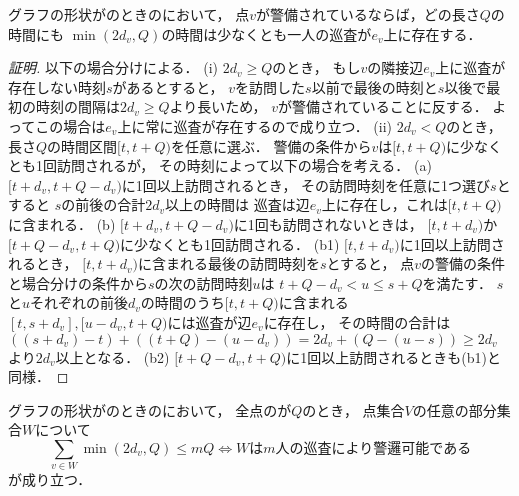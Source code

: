 \begin{lemm}
\label{lemm:star_cost_of_vertex}
グラフの形状が{\graphStar}のときの{\patProb}において，
点$v$が警備されているならば，どの長さ$Q$の時間にも
$\min(2d_v, Q)$の時間は少なくとも一人の巡査が$e_v$上に存在する．
\end{lemm}
\begin{proof}[証明]
以下の場合分けによる．
(i) $2d_v \geq Q$のとき，
もし$v$の隣接辺$e_v$上に巡査が存在しない時刻$s$があるとすると，
$v$を訪問した$s$以前で最後の時刻と$s$以後で最初の時刻の間隔は$2d_v \geq Q$より長いため，
$v$が警備されていることに反する．
よってこの場合は$e_v$上に常に巡査が存在するので成り立つ．
%
(ii) $2d_v < Q$のとき，
長さ$Q$の時間区間$[t, t + Q)$を任意に選ぶ．
警備の条件から$v$は$[t, t + Q)$に少なくとも1回訪問されるが，
その時刻によって以下の場合を考える．
%
(a) $[t + d_v, t + Q - d_v)$に1回以上訪問されるとき，
その訪問時刻を任意に1つ選び$s$とすると
$s$の前後の合計$2d_v$以上の時間は
巡査は辺$e_v$上に存在し，これは$[t, t + Q)$に含まれる．
%
(b) $[t + d_v, t + Q - d_v)$に1回も訪問されないときは，
$[t, t + d_v)$か$[t + Q - d_v, t + Q)$に少なくとも1回訪問される．
(b1) $[t, t + d_v)$に1回以上訪問されるとき，
$[t, t + d_v)$に含まれる最後の訪問時刻を$s$とすると，
点$v$の警備の条件と場合分けの条件から$s$の次の訪問時刻$u$は
$t + Q - d_v < u \leq s + Q$を満たす．
$s$と$u$それぞれの前後$d_v$の時間のうち$[t, t + Q)$に含まれる
$[t, s + d_v], [u - d_v, t + Q)$には巡査が辺$e_v$に存在し，
その時間の合計は
$((s + d_v) - t) + ((t + Q) - (u - d_v)) = 2d_v + (Q - (u - s)) \geq 2d_v$
より$2d_v$以上となる．
(b2) $[t + Q - d_v, t + Q)$に1回以上訪問されるときも(b1)と同様．
\end{proof}



\begin{lemm}
\label{lemm:condition_of_guarding_star}
グラフの形状が{\graphStar}のときの{\patProb}において，
全点の{\idletime}が$Q$のとき，
点集合$V$の任意の部分集合$W$について
$$
\sum_{v \in W} \min(2d_v, Q) \leq mQ
\iff \textrm{$W$は$m$人の巡査により警邏可能である}
$$
が成り立つ．
\end{lemm}

